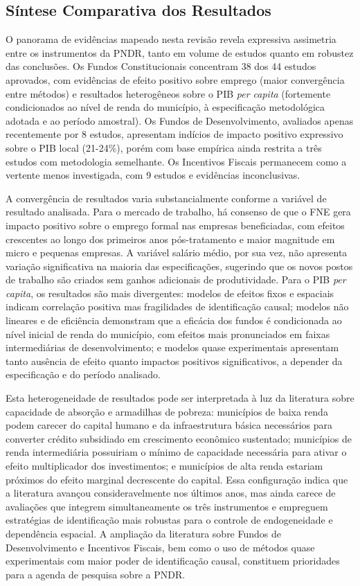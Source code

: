 \subsection{Síntese Comparativa dos Resultados}

O panorama de evidências mapeado nesta revisão revela expressiva assimetria entre os instrumentos da PNDR, tanto em volume de estudos quanto em robustez das conclusões. Os Fundos Constitucionais concentram 38 dos 44 estudos aprovados, com evidências de efeito positivo sobre emprego (maior convergência entre métodos) e resultados heterogêneos sobre o PIB \textit{per capita} (fortemente condicionados ao nível de renda do município, à especificação metodológica adotada e ao período amostral). Os Fundos de Desenvolvimento, avaliados apenas recentemente por 8 estudos, apresentam indícios de impacto positivo expressivo sobre o PIB local (21-24\%), porém com base empírica ainda restrita a três estudos com metodologia semelhante. Os Incentivos Fiscais permanecem como a vertente menos investigada, com 9 estudos e evidências inconclusivas.

A convergência de resultados varia substancialmente conforme a variável de resultado analisada. Para o mercado de trabalho, há consenso de que o FNE gera impacto positivo sobre o emprego formal nas empresas beneficiadas, com efeitos crescentes ao longo dos primeiros anos pós-tratamento e maior magnitude em micro e pequenas empresas. A variável salário médio, por sua vez, não apresenta variação significativa na maioria das especificações, sugerindo que os novos postos de trabalho são criados sem ganhos adicionais de produtividade. Para o PIB \textit{per capita}, os resultados são mais divergentes: modelos de efeitos fixos e espaciais indicam correlação positiva mas fragilidades de identificação causal; modelos não lineares e de eficiência demonstram que a eficácia dos fundos é condicionada ao nível inicial de renda do município, com efeitos mais pronunciados em faixas intermediárias de desenvolvimento; e modelos quase experimentais apresentam tanto ausência de efeito quanto impactos positivos significativos, a depender da especificação e do período analisado.

Esta heterogeneidade de resultados pode ser interpretada à luz da literatura sobre capacidade de absorção e armadilhas de pobreza: municípios de baixa renda podem carecer do capital humano e da infraestrutura básica necessários para converter crédito subsidiado em crescimento econômico sustentado; municípios de renda intermediária possuiriam o mínimo de capacidade necessária para ativar o efeito multiplicador dos investimentos; e municípios de alta renda estariam próximos do efeito marginal decrescente do capital. Essa configuração indica que a literatura avançou consideravelmente nos últimos anos, mas ainda carece de avaliações que integrem simultaneamente os três instrumentos e empreguem estratégias de identificação mais robustas para o controle de endogeneidade e dependência espacial. A ampliação da literatura sobre Fundos de Desenvolvimento e Incentivos Fiscais, bem como o uso de métodos quase experimentais com maior poder de identificação causal, constituem prioridades para a agenda de pesquisa sobre a PNDR.
